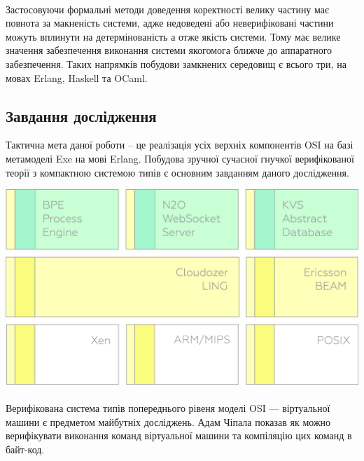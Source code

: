 \documentclass[11pt,oneside]{article}
\begin{document}
   \paragraph{}
   Застосовуючи формальні методи доведення коректності велику частину має повнота за макненість системи,
   адже недоведені або неверифіковані частини можуть вплинути на детермінованість а отже якість системи.
   Тому має велике значення забезпечення виконання системи якогомога ближче до аппаратного забезпечення.
   Таких напрямків побудови замкнених середовищ є всього три, на мовах Erlang, Haskell та OCaml.

\newpage
\subsection{Завдання дослідження}
\vspace{0.5cm}
   Тактична мета даної роботи -- це
   реалізація усіх верхніх компонентів OSI на базі метамоделі Exe на мові Erlang.
   Побудова зручної сучасної гнучкої верифікованої теорії
   з компактною системою типів є основним завданням даного дослідження.

   \begin{center}
   \vspace{0.5cm}
   \includegraphics[scale=0.15]{img/exe-res}
   \end{center}

   \paragraph{}
   Верифікована система типів попереднього рівеня моделі OSI --- віртуальної машини
   є предметом майбутніх досліджень. Адам Чіпала \cite{chipvm} показав як можно
   верифікувати виконання команд віртуальної машини та компіляцію цих команд в байт-код.
\end{document}
